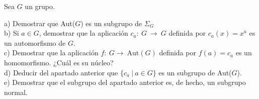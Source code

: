 \documentclass{article}
\begin{document}
Sea $G$ un grupo.
\begin{adjustwidth}{1cm}{}
  a) Demostrar que Aut($G$) es un subgrupo de $\Sigma_G$\\
  b) Si $a \in G$, demostrar que la aplicación $c_a: \ G \ \longrightarrow \ G$ definida por $c_a(x) = x^{a}$ es un automorfismo de $G$.\\
  c) Demostrar que la aplicación $f: \ G \longrightarrow \ \text{Aut}(G)$ definida por $f(a) = c_a$ es un homomorfismo. ¿Cuál es su núcleo?\\
  d) Deducir del apartado anterior que $\{c_a \ | \ a \in G\}$ es un subgrupo de Aut($G$).\\
  e) Demostrar que el subgrupo del apartado anterior es, de hecho, un subgrupo normal.\\
\end{adjustwidth}
\end{document}
